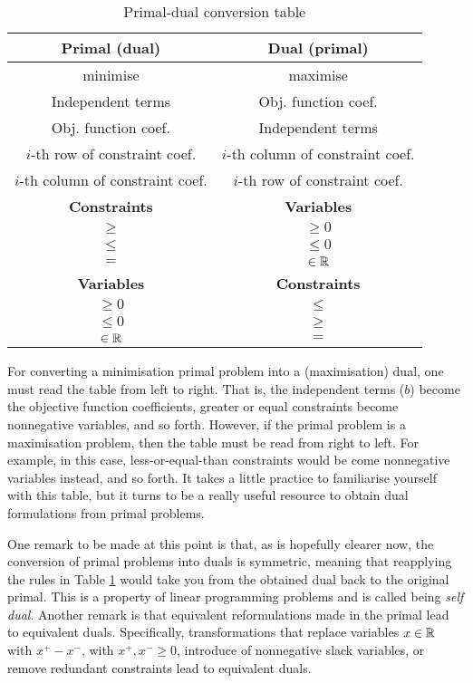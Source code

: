 \begin{table}[h]
	\begin{tabular}{|c|c|} \hline
		{\bf Primal (dual)} & {\bf Dual (primal)} \\ \hline
		 minimise & maximise \\
		Independent terms  & Obj. function coef.  \\
		Obj. function coef.  & Independent terms  \\
		$i$-th row of constraint coef. & $i$-th column of constraint coef. \\
		$i$-th column of constraint coef. & $i$-th row of constraint coef. \\ \hline
		{\bf Constraints} & {\bf Variables} \\ \hline
		$\geq$ & $\geq 0$ \\
		$\leq$ & $\leq 0$ \\
		$=$ & $\in \mathbb{R}$ \\ \hline
		{\bf Variables} & {\bf Constraints} \\ \hline
		$\geq 0$ & $\leq$ \\
		$\leq 0$ & $\geq$ \\
		$\in \mathbb{R}$ & $=$ \\ \hline
	\end{tabular}
	\caption{Primal-dual conversion table} \label{p1c5:tab:primal-dual_conversion}
\end{table}

For converting a minimisation primal problem into a (maximisation) dual, one must read the table from left to right. That is, the independent terms ($b$) become the objective function coefficients, greater or equal constraints become nonnegative variables, and so forth. However, if the primal problem is a maximisation problem, then the table must be read from right to left. For example, in this case, less-or-equal-than constraints would be come nonnegative variables instead, and so forth. It takes a little practice to familiarise yourself with this table, but it turns to be a really useful resource to obtain dual formulations from primal problems.

One remark to be made at this point is that, as is hopefully clearer now, the conversion of primal problems into duals is symmetric, meaning that reapplying the rules in Table \ref{p1c5:tab:primal-dual_conversion} would take you from the obtained dual back to the original primal. This is a property of linear programming problems and is called being \emph{self dual}. Another remark is that equivalent reformulations made in the primal lead to equivalent duals. Specifically, transformations that replace variables $x \in \mathbb{R}$ with $x^+ - x^-$, with $x^+, x^- \geq 0$, introduce of nonnegative slack variables, or remove redundant constraints lead to equivalent duals. 

